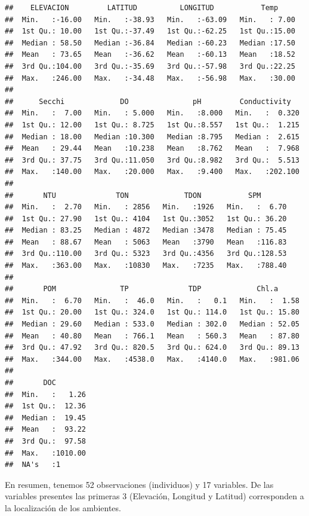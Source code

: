 \documentclass[
]{book}
\begin{document}
\begin{verbatim}
##    ELEVACION         LATITUD          LONGITUD           Temp      
##  Min.   :-16.00   Min.   :-38.93   Min.   :-63.09   Min.   : 7.00  
##  1st Qu.: 10.00   1st Qu.:-37.49   1st Qu.:-62.25   1st Qu.:15.00  
##  Median : 58.50   Median :-36.84   Median :-60.23   Median :17.50  
##  Mean   : 73.65   Mean   :-36.62   Mean   :-60.13   Mean   :18.52  
##  3rd Qu.:104.00   3rd Qu.:-35.69   3rd Qu.:-57.98   3rd Qu.:22.25  
##  Max.   :246.00   Max.   :-34.48   Max.   :-56.98   Max.   :30.00  
##                                                                    
##      Secchi             DO               pH         Conductivity    
##  Min.   :  7.00   Min.   : 5.000   Min.   :8.000   Min.   :  0.320  
##  1st Qu.: 12.00   1st Qu.: 8.725   1st Qu.:8.557   1st Qu.:  1.215  
##  Median : 18.00   Median :10.300   Median :8.795   Median :  2.615  
##  Mean   : 29.44   Mean   :10.238   Mean   :8.762   Mean   :  7.968  
##  3rd Qu.: 37.75   3rd Qu.:11.050   3rd Qu.:8.982   3rd Qu.:  5.513  
##  Max.   :140.00   Max.   :20.000   Max.   :9.400   Max.   :202.100  
##                                                                     
##       NTU              TON             TDON           SPM        
##  Min.   :  2.70   Min.   : 2856   Min.   :1926   Min.   :  6.70  
##  1st Qu.: 27.90   1st Qu.: 4104   1st Qu.:3052   1st Qu.: 36.20  
##  Median : 83.25   Median : 4872   Median :3478   Median : 75.45  
##  Mean   : 88.67   Mean   : 5063   Mean   :3790   Mean   :116.83  
##  3rd Qu.:110.00   3rd Qu.: 5323   3rd Qu.:4356   3rd Qu.:128.53  
##  Max.   :363.00   Max.   :10830   Max.   :7235   Max.   :788.40  
##                                                                  
##       POM               TP              TDP             Chl.a       
##  Min.   :  6.70   Min.   :  46.0   Min.   :   0.1   Min.   :  1.58  
##  1st Qu.: 20.00   1st Qu.: 324.0   1st Qu.: 114.0   1st Qu.: 15.80  
##  Median : 29.60   Median : 533.0   Median : 302.0   Median : 52.05  
##  Mean   : 40.80   Mean   : 766.1   Mean   : 560.3   Mean   : 87.80  
##  3rd Qu.: 47.92   3rd Qu.: 820.5   3rd Qu.: 624.0   3rd Qu.: 89.13  
##  Max.   :344.00   Max.   :4538.0   Max.   :4140.0   Max.   :981.06  
##                                                                     
##       DOC         
##  Min.   :   1.26  
##  1st Qu.:  12.36  
##  Median :  19.45  
##  Mean   :  93.22  
##  3rd Qu.:  97.58  
##  Max.   :1010.00  
##  NA's   :1
\end{verbatim}

En resumen, tenemos 52 observaciones (individuos) y 17 variables. De las variables presentes las primeras 3 (Elevación, Longitud y Latitud) corresponden a la localización de los ambientes.
\end{document}
